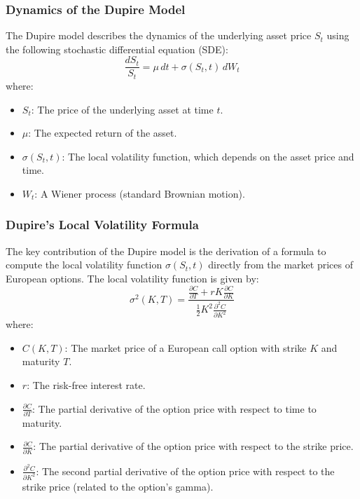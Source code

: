 \documentclass[11pt, oneside, a4paper, titlepage]{report}
\begin{document}
\subsubsection{Dynamics of the Dupire Model}

The Dupire model describes the dynamics of the underlying asset price \( S_t \) using the following stochastic differential equation (SDE):
\[
\frac{dS_t}{S_t} = \mu \, dt + \sigma(S_t, t) \, dW_t
\]
where:
\begin{itemize}
    \item \( S_t \): The price of the underlying asset at time \( t \).
    \item \( \mu \): The expected return of the asset.
    \item \( \sigma(S_t, t) \): The local volatility function, which depends on the asset price and time.
    \item \( W_t \): A Wiener process (standard Brownian motion).
\end{itemize}

\subsubsection{Dupire's Local Volatility Formula}

The key contribution of the Dupire model is the derivation of a formula to compute the local volatility function \( \sigma(S_t, t) \) directly from the market prices of European options. The local volatility function is given by:
\[
\sigma^2(K, T) = \frac{\frac{\partial C}{\partial T} + r K \frac{\partial C}{\partial K}}{\frac{1}{2} K^2 \frac{\partial^2 C}{\partial K^2}}
\]
where:
\begin{itemize}
    \item \( C(K, T) \): The market price of a European call option with strike \( K \) and maturity \( T \).
    \item \( r \): The risk-free interest rate.
    \item \( \frac{\partial C}{\partial T} \): The partial derivative of the option price with respect to time to maturity.
    \item \( \frac{\partial C}{\partial K} \): The partial derivative of the option price with respect to the strike price.
    \item \( \frac{\partial^2 C}{\partial K^2} \): The second partial derivative of the option price with respect to the strike price (related to the option's gamma).
\end{itemize}
\end{document}
